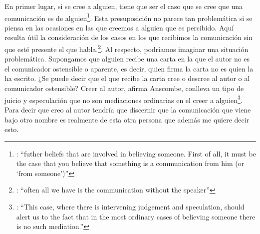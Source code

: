 En primer lugar, si se cree a alguien, tiene que ser el caso que se cree que una comunicación es de alguien\footnote{\cite[Cf.~][6]{anscombe2008faith:tobelieve}: \enquote{futher beliefs that are involved in believing someone. First of all, it must be the case that you believe that something is a communication from him (or `from someone')}}. Esta presuposición no parece tan problemática si se piensa en las ocasiones en las que creemos a alguien que es percibido. Aquí resulta útil la consideración de los casos en los que recibimos la comunicación sin que esté presente el que habla.\footnote{\cite[Cf.~][5]{anscombe2008faith:tobelieve}: \enquote{often all we have is the communication without the speaker}}. Al respecto, podríamos imaginar una situación problemática. Supongamos que alguien recibe una carta en la que el autor no es el comunicador ostensible o aparente, es decir, quien firma la carta no es quien la ha escrito. ¿Se puede decir que el que recibe la carta cree o descree al autor o al comunicador ostensible? Creer al autor, afirma Anscombe, conlleva un tipo de juicio y especulación que no son mediaciones ordinarias en el creer a alguien\footnote{\cite[Cf.~][7]{anscombe2008faith:tobelieve}: \enquote{This case, where there is intervening judgement and speculation, should alert us to the fact that in the most ordinary cases of believing someone there is no such mediation.}}. Para decir que creo al autor tendría que discernir que la comunicación que viene bajo otro nombre es realmente de esta otra persona que además me quiere decir esto.

